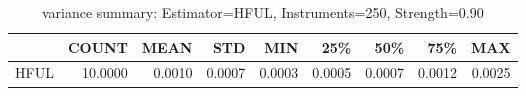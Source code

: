 \begin{table}[ht]
\centering
\caption{variance summary: Estimator=HFUL, Instruments=250, Strength=0.90}
\begin{tabular}{lrrrrrrrr}
\toprule
 & COUNT & MEAN & STD & MIN & 25\% & 50\% & 75\% & MAX \\
\midrule
HFUL & 10.0000 & 0.0010 & 0.0007 & 0.0003 & 0.0005 & 0.0007 & 0.0012 & 0.0025 \\
\bottomrule
\end{tabular}
\end{table}
